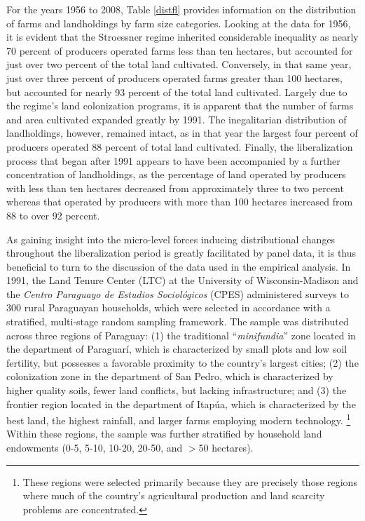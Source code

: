 \documentclass[english]{article}
\begin{document}
For the years 1956 to 2008, Table \ref{distfl} provides information on the 
distribution of farms and landholdings by farm size categories. 
Looking at the data for 1956, it is evident that the Stroessner regime 
inherited considerable inequality as nearly 70 percent of producers 
operated farms less than ten hectares, but accounted for just over two 
percent of the total land cultivated.
Conversely, in that same year, just over three percent of producers operated
farms greater than 100 hectares, but accounted for nearly 93 percent
of the total land cultivated.
Largely due to the regime's land colonization programs, it is apparent that 
the number of farms and area cultivated expanded greatly by 1991. 
The inegalitarian distribution of landholdings, however, remained intact, as in 
that year the largest four percent of producers operated 88 percent of total 
land cultivated.
Finally, the liberalization process that began after 1991 appears to have been
accompanied by a further concentration of landholdings, as the percentage of 
land operated by producers with less than ten hectares decreased from 
approximately three to two percent whereas that operated by producers with 
more than 100 hectares increased from 88 to over 92 percent.

As gaining insight into the micro-level forces inducing distributional changes 
throughout the liberalization period is greatly facilitated by panel data, it is thus 
beneficial to turn to the discussion of the data used in the empirical analysis.
In 1991, the Land Tenure Center (LTC) at the University of 
Wisconsin-Madison and the \emph{Centro Paraguayo de Estudios 
Sociol\'{o}gicos} (CPES) administered surveys to 300 rural Paraguayan 
households, which were selected in accordance with a stratified, multi-stage 
random sampling framework. 
The sample was distributed across three regions of Paraguay: (1) the traditional 
``\emph{minifundia}'' zone located in the department of Paraguar\'{i}, 
which is characterized by small plots and low soil fertility, but possesses a 
favorable proximity to the country's largest cities; (2) the colonization zone in 
the department of San Pedro, which is characterized by higher quality soils, 
fewer land conflicts, but lacking infrastructure; and (3) the frontier region 
located in the department of Itap\'{u}a, which is characterized by the best 
land, the highest rainfall, and larger farms employing modern technology.%
\footnote{These regions were selected primarily because they are precisely 
those regions where much of the country's agricultural production and 
land scarcity problems are concentrated.}
Within these regions, the sample was further stratified by household land 
endowments (0-5, 5-10, 10-20, 20-50, and $>$50 hectares).
\end{document}
